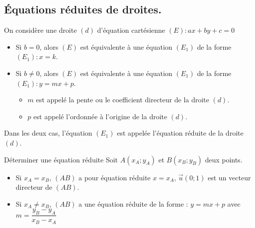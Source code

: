 
\begin{pageCours} %


\section{Équations réduites de droites.}

\begin{Def}
On considère une droite $(d)$ d'équation cartésienne $(E):ax+by+c=0$
\begin{itemize}
\item Si $b=0$, alors $(E)$ est équivalente à une équation $(E_1)$ de la forme $(E_1):x=k$.
\item Si $b\neq0$, alors $(E)$ est équivalente à une équation $(E_1)$ de la forme $(E_1):y=mx+p$.
\begin{itemize}
\item $m$ est appelé la pente ou le coefficient directeur de la droite $(d)$.
\item $p$ est appelé l'ordonnée à l'origine de la droite $(d)$.
\end{itemize}
\end{itemize}
Dans les deux cas, l'équation $(E_1)$ est appelée l'équation réduite de la droite $(d)$.
\end{Def}


\begin{PpT}{Déterminer une équation réduite}
Soit $A(x_A;y_A)$ et $B(x_B;y_B)$ deux points.
\begin{itemize}
\item Si $x_A=x_B$, $(AB)$ a pour équation réduite $x=x_A$, $\vec{u}(0;1)$ est un vecteur directeur de $(AB)$.
\item Si $x_A\neq x_B$, $(AB)$ a une équation réduite de la forme : $y=mx+p$ avec $m=\dfrac{y_B-y_A}{x_B-x_A}$


\end{itemize}
\end{PpT}
\end{pageCours}
